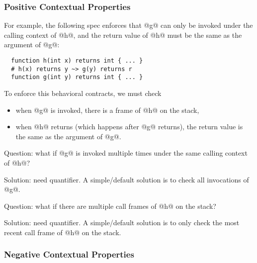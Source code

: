 
\subsubsection{Positive Contextual Properties}

For example, the following spec enforces that @g@ can only be invoked
under the calling context of @h@, and the return value of @h@ must be
the same as the argument of @g@:

\begin{lstlisting}
  function h(int x) returns int { ... }
  # h(x) returns y ~> g(y) returns r
  function g(int y) returns int { ... }
\end{lstlisting}

To enforce this behavioral contracts, we must check
\begin{itemize}
	\item when @g@ is invoked, there is a frame of @h@ on the stack,
	\item when @h@ returns (which happens after @g@ returns), the return value
	      is the same as the argument of @g@.
\end{itemize}

Question: what if @g@ is invoked multiple times under the same calling context of
@h@?

Solution: need quantifier. A simple/default solution is to check all
invocations of @g@.

Question: what if there are multiple call frames of @h@ on the stack?

Solution: need quantifier. A simple/default solution is to only check
the most recent call frame of @h@ on the stack.


\subsubsection{Negative Contextual Properties}

